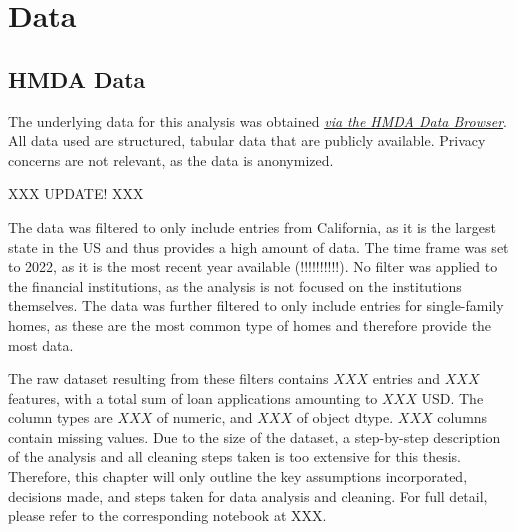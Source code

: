 \chapter{Data}\label{ch:Data}


\section{HMDA Data}\label{sec:HMDA_Data}


The underlying data for this analysis was obtained \textit{\href{https://ffiec.cfpb.gov/data-browser/data/2022?category=states}{via the HMDA Data Browser}}. \@
All data used are structured, tabular data that are publicly available. Privacy concerns are not relevant, as the data is anonymized.

XXX UPDATE! XXX

The data was filtered to only include entries from California, as it is the largest state in the US and thus provides a high amount of data. 
The time frame was set to 2022, as it is the most recent year available (!!!!!!!!!!). No filter was applied to the financial institutions, as the analysis is not focused on the institutions themselves. 
The data was further filtered to only include entries for single-family homes, as these are the most common type of homes and therefore provide the most data.

The raw dataset resulting from these filters contains $XXX$ entries and $XXX$ features, with a total sum of loan applications amounting to $XXX$ USD. The column types are $XXX$ of numeric, and $XXX$ of object dtype. $XXX$ columns contain missing values. \@
Due to the size of the dataset, a step-by-step description of the analysis and all cleaning steps taken is too extensive for this thesis. Therefore, this chapter will only outline the key assumptions incorporated, decisions made, and steps taken for data analysis and cleaning. For full detail, please refer to the corresponding notebook at XXX.

